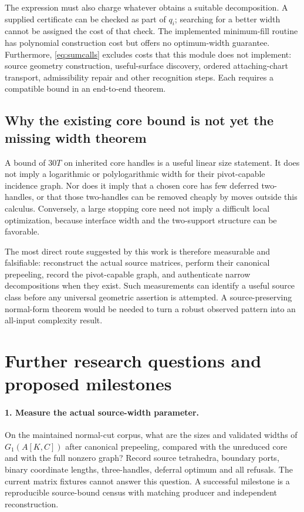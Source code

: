 \documentclass[11pt]{article}
\theoremstyle{definition}\newtheorem{definition}[theorem]{Definition}
\theoremstyle{remark}\newtheorem{remark}[theorem]{Remark}
\begin{document}
The expression must also charge whatever obtains a suitable decomposition. A supplied certificate can be checked as part of $q_i$; searching for a better width cannot be assigned the cost of that check. The implemented minimum-fill routine has polynomial construction cost but offers no optimum-width guarantee. Furthermore, \eqref{eq:sumcalls} excludes costs that this module does not implement: source geometry construction, useful-surface discovery, ordered attaching-chart transport, admissibility repair and other recognition steps. Each requires a compatible bound in an end-to-end theorem.

\subsection{Why the existing core bound is not yet the missing width theorem}
A bound of $30T$ on inherited core handles is a useful linear size statement. It does not imply a logarithmic or polylogarithmic width for their pivot-capable incidence graph. Nor does it imply that a chosen core has few deferred two-handles, or that those two-handles can be removed cheaply by moves outside this calculus. Conversely, a large stopping core need not imply a difficult local optimization, because interface width and the two-support structure can be favorable.

The most direct route suggested by this work is therefore measurable and falsifiable: reconstruct the actual source matrices, perform their canonical prepeeling, record the pivot-capable graph, and authenticate narrow decompositions when they exist. Such measurements can identify a useful source class before any universal geometric assertion is attempted. A source-preserving normal-form theorem would be needed to turn a robust observed pattern into an all-input complexity result.

\section{Further research questions and proposed milestones}
\label{sec:research}

\paragraph{1. Measure the actual source-width parameter.}
On the maintained normal-cut corpus, what are the sizes and validated widths of $G_1(A[K,C])$ after canonical prepeeling, compared with the unreduced core and with the full nonzero graph? Record source tetrahedra, boundary ports, binary coordinate lengths, three-handles, deferral optimum and all refusals. The current matrix fixtures cannot answer this question. A successful milestone is a reproducible source-bound census with matching producer and independent reconstruction.
\end{document}
